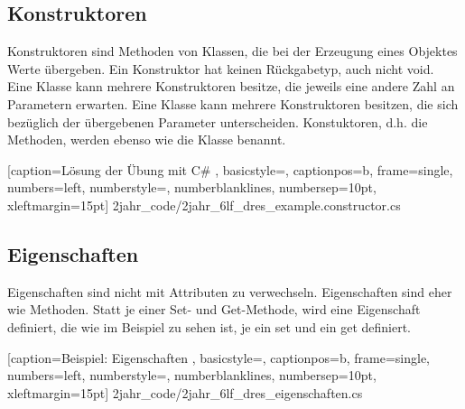 \subsection{Konstruktoren}

Konstruktoren sind Methoden von Klassen, die bei der Erzeugung eines Objektes Werte übergeben. Ein Konstruktor hat keinen Rückgabetyp, auch nicht void. Eine Klasse kann mehrere Konstruktoren besitze, die jeweils eine andere Zahl an Parametern erwarten. Eine Klasse kann mehrere Konstruktoren besitzen, die sich bezüglich der übergebenen Parameter unterscheiden. Konstuktoren, d.h. die Methoden, werden ebenso wie die Klasse benannt.


	[caption={Lösung der Übung mit C\#}
	\label{lst:6lf_dres_example.constructor.cs},
	basicstyle=\small,
	captionpos=b,
	frame=single,
	numbers=left,
	numberstyle=\small,
	numberblanklines,
	numbersep=10pt,
	xleftmargin=15pt]
	{2jahr_code/2jahr_6lf_dres_example.constructor.cs}
	
\subsection{Eigenschaften}

Eigenschaften sind nicht mit Attributen zu verwechseln. Eigenschaften sind eher wie Methoden. Statt je einer Set- und Get-Methode, wird eine Eigenschaft definiert, die wie im Beispiel zu sehen ist, je ein set und ein get definiert.


	[caption={Beispiel: Eigenschaften}
	\label{lst:2jahr_6lf_dres_eigenschaften},
	basicstyle=\small,
	captionpos=b,
	frame=single,
	numbers=left,
	numberstyle=\small,
	numberblanklines,
	numbersep=10pt,
	xleftmargin=15pt]
	{2jahr_code/2jahr_6lf_dres_eigenschaften.cs}